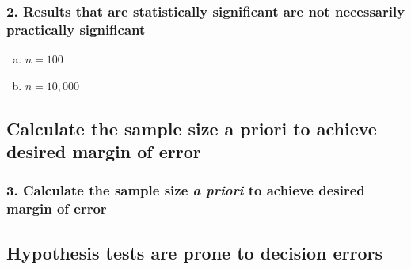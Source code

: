 \documentclass[11pt,containsverbatim,handout,xcolor=xelatex,dvipsnames,table]{beamer}
\newcommand{\solnMult}[1]{#1}
\newcommand{\soln}[1]{}
\begin{document}
\begin{frame}
\frametitle{2. Results that are statistically significant are not necessarily practically significant}


\begin{enumerate}[(a)]
\item $n = 100$
\item \solnMult{$n = 10,000$}
\end{enumerate}

\soln{\pause \pause
Suppose $\bar{x} = 5$, $s = 2$, $H_0: \mu = 4.5$, and $H_A: \mu \ge 4.5$.\\
\pause
{\small
\begin{eqnarray*}
Z_{n = 100} &=& \frac{5 - 4.5}{\frac{2}{\sqrt{100}}} \pause = \frac{5 - 4.5}{\frac{2}{10}} = \frac{0.5}{0.2} = 2.5,~~~\text{p-value} = 0.0062 \\
\pause
Z_{n = 10000} &=& \frac{5 - 4.5}{\frac{2}{\sqrt{10000}}} \pause = \frac{5 - 4.5}{\frac{2}{100}} = \frac{0.5}{0.02} = 25,~~~\text{p-value} \approx 0
\end{eqnarray*}
}
\pause
\begin{center}
As $n$ increases - $SE$ $\downarrow$, $Z$ $\uparrow$, p-value $\downarrow$
\end{center}
}

\end{frame}


\subsection{Calculate the sample size a priori to achieve desired margin of error}
\label{mi3}


\begin{frame}
\frametitle{3. Calculate the sample size \textit{a priori} to achieve desired margin of error}

\vfill


\vfill

\end{frame}


\subsection{Hypothesis tests are prone to decision errors}
\label{mi4}
\end{document}
